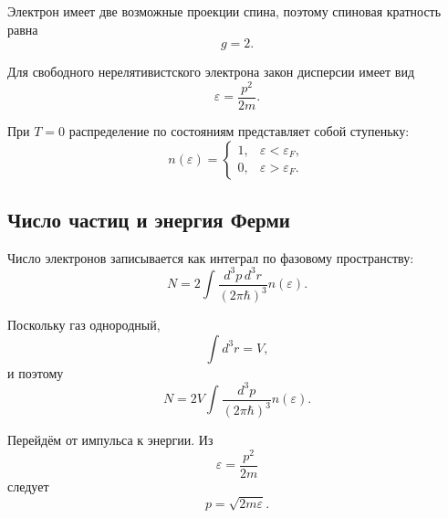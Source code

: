 \documentclass[../final.tex]{subfiles}
\begin{document}
Электрон имеет две возможные проекции спина, поэтому
спиновая кратность равна
%
\begin{equation*}
    g=2.
\end{equation*}

Для свободного нерелятивистского электрона закон дисперсии имеет вид
%
\begin{equation*}
    \varepsilon
    =
    \frac{p^2}{2m}.
\end{equation*}

При $T=0$ распределение по состояниям представляет собой ступеньку:
%
\begin{equation*}
    n(\varepsilon)
    =
    \begin{cases}
        1,
        &
        \varepsilon<\varepsilon_F,
        \\[4pt]
        0,
        &
        \varepsilon>\varepsilon_F.
    \end{cases}
\end{equation*}



\subsection*{Число частиц и энергия Ферми}

Число электронов записывается как интеграл по фазовому пространству:
%
\begin{equation*}
    N
    =
    2
    \int
    \frac{
        d^3p\,d^3r
    }{
        (2\pi\hbar)^3
    }
    n(\varepsilon).
\end{equation*}

Поскольку газ однородный,
%
\begin{equation*}
    \int d^3r
    =
    V,
\end{equation*}
%
и поэтому
%
\begin{equation*}
    N
    =
    2V
    \int
    \frac{
        d^3p
    }{
        (2\pi\hbar)^3
    }
    n(\varepsilon).
\end{equation*}

Перейдём от импульса к энергии.
Из
%
\begin{equation*}
    \varepsilon
    =
    \frac{p^2}{2m}
\end{equation*}
%
следует
%
\begin{equation*}
    p
    =
    \sqrt{2m\varepsilon}.
\end{equation*}
\end{document}
